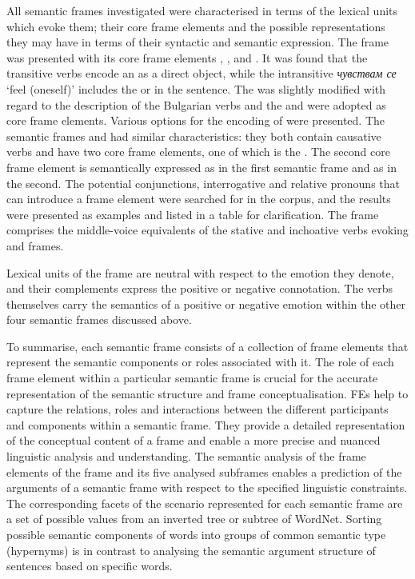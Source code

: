 \documentclass[output=paper,colorlinks,citecolor=brown]{langscibook}
\begin{document}
All semantic frames investigated were characterised in terms of the lexical units which evoke them; their core frame elements and the possible representations they may have in terms of their syntactic and semantic expression. The frame  was presented with its core frame elements , ,  and . It was found that the transitive verbs encode an  as a direct object, while the intransitive \textit{чувствам се} `feel (oneself)' includes the  or  in the sentence. The  was slightly modified with regard to the description of the Bulgarian verbs and the  and  were adopted as core frame elements. Various options for the encoding of  were presented. The semantic frames  and  had similar characteristics: they both contain causative verbs and have two core frame elements, one of which is the . The second core frame element is semantically expressed as  in the first semantic frame and as  in the second. The potential conjunctions, interrogative and relative pronouns that can introduce a frame element were searched for in the corpus, and the results were presented as examples and listed in a table for clarification. The frame  comprises the middle-voice equivalents of the stative and inchoative verbs evoking  and  frames.
 
Lexical units of the frame  are neutral with respect to the emotion they denote, and their complements express the positive or negative connotation. The verbs themselves carry the semantics of a positive or negative emotion within the other four semantic frames discussed above.

To summarise, each semantic frame consists of a collection of frame elements that represent the semantic components or roles associated with it. The role of each frame element within a particular semantic frame is crucial for the accurate representation of the semantic structure and frame conceptualisation. FEs help to capture the relations, roles and interactions between the different participants and components within a semantic frame. They provide a detailed representation of the conceptual content of a frame and enable a more precise and nuanced linguistic analysis and understanding. The semantic analysis of the frame elements of the frame  and its five analysed subframes enables a prediction of the arguments of a semantic frame with respect to the specified linguistic constraints. The corresponding facets of the scenario represented for each semantic frame are a set of possible values from an inverted tree or subtree of WordNet. Sorting possible semantic components of words into groups of common semantic type (hypernyms) is in contrast to analysing the semantic argument structure of sentences based on specific words.
\end{document}
